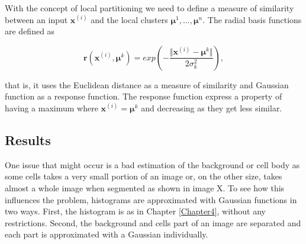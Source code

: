 With the concept of local partitioning we need to define a measure of similarity between an input $\mathbf{x}^{(i)}$ and the local clusters $\boldsymbol \mu^1, \ldots, \boldsymbol \mu^n$. The radial basis functions are defined as

\begin{equation}
	\mathbf{r}(\mathbf{x}^{(i)}, \boldsymbol \mu^k) = exp \left (- \frac{\Vert \mathbf{x}^{(i)}  - \boldsymbol \mu^k \Vert}{2\sigma_k^2} \right ),
\end{equation} 

that is, it uses the Euclidean distance as a measure of similarity and Gaussian function as a response function. The response function express a property of having a maximum where $\mathbf{x}^{(i)} = \boldsymbol \mu^k$ and decreasing as they get less similar. 





\subsection{Results}

One issue that might occur is a bad estimation of the background or cell body as some cells takes a very small portion of an image or, on the other size, takes almost a whole image when segmented as shown in image X. To see how this influences the problem, histograms are approximated with Gaussian functions in two ways. First, the histogram is as in Chapter \ref{Chapter4}, without any restrictions. Second, the background and cells part of an image are separated and each part is approximated with a Gaussian individually. 